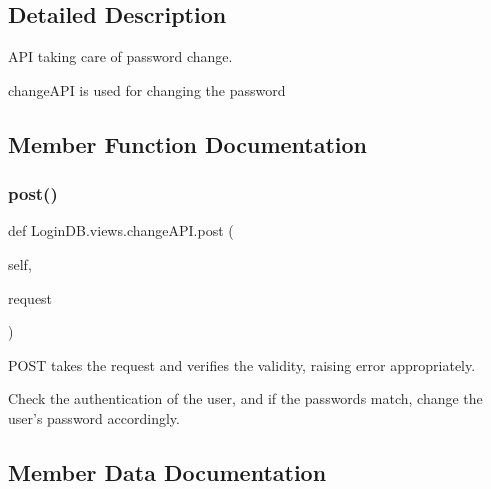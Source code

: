 \subsection{Detailed Description}
A\+PI taking care of password change. 

\begin{DoxyVerb}changeAPI is used for changing the password
\end{DoxyVerb}
 

\subsection{Member Function Documentation}
\mbox{\label{class_login_d_b_1_1views_1_1change_a_p_i_af2fb1243472271e274beffb7a4309358}} 
\subsubsection{\texorpdfstring{post()}{post()}}
{\footnotesize\ttfamily def Login\+D\+B.\+views.\+change\+A\+P\+I.\+post (\begin{DoxyParamCaption}\item[{}]{self,  }\item[{}]{request }\end{DoxyParamCaption})}



P\+O\+ST takes the request and verifies the validity, raising error appropriately. 

\begin{DoxyVerb}Check the authentication of the user, and if the passwords match, change the user's password accordingly.
\end{DoxyVerb}
 

\subsection{Member Data Documentation}
\mbox{\label{class_login_d_b_1_1views_1_1change_a_p_i_aa05c99b11b6324e43b9864b9fc9ec5fc}} 
